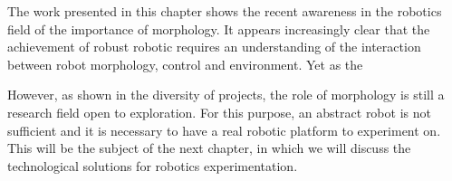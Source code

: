 The work presented in this chapter shows the recent awareness in the robotics field of the importance of morphology. It appears increasingly clear that the achievement of robust robotic requires an understanding of the interaction between robot morphology, control and environment. Yet as the

However, as shown in the diversity of projects, the role of morphology is still a research field open to exploration. For this purpose, an abstract robot is not sufficient and it is necessary to have a real robotic platform to experiment on. This will be the subject of the next chapter, in which we will discuss the technological solutions for robotics experimentation.


